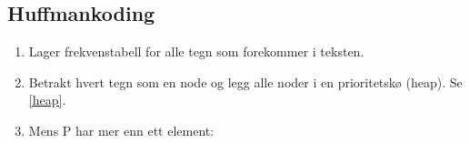 	\subsection{\color{red}Huffmankoding}\label{huffman}
		\begin{enumerate}
			\item Lager frekvenstabell for alle tegn som forekommer i teksten.
			\item Betrakt hvert tegn som en node og legg alle noder i en prioritetskø (heap). Se \ref{heap}.
			\item Mens P har mer enn ett element:
					
		\end{enumerate}